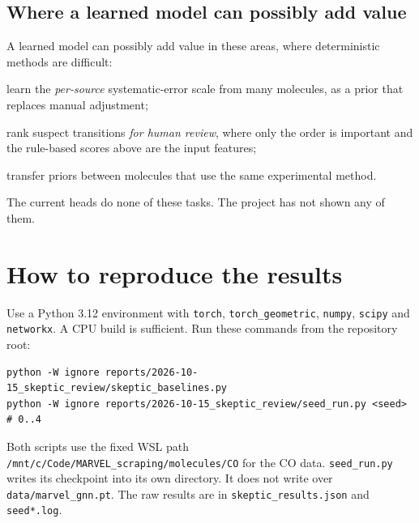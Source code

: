 \documentclass[11pt,a4paper]{article}
\newcommand{\code}[1]{\texttt{#1}}
\begin{document}
\subsection*{Where a learned model can possibly add value}
A learned model can possibly add value in these areas, where deterministic methods
are difficult:
\begin{enumerate*}[label=(\roman*)]
\item learn the \emph{per-source} systematic-error scale from many molecules, as a
  prior that replaces manual adjustment;
\item rank suspect transitions \emph{for human review}, where only the order is
  important and the rule-based scores above are the input features;
\item transfer priors between molecules that use the same experimental method.
\end{enumerate*}
The current heads do none of these tasks. The project has not shown any of them.

\appendix
\section{How to reproduce the results}
Use a Python 3.12 environment with \code{torch}, \code{torch\_geometric},
\code{numpy}, \code{scipy} and \code{networkx}. A CPU build is sufficient. Run these
commands from the repository root:
\begin{verbatim}
python -W ignore reports/2026-10-15_skeptic_review/skeptic_baselines.py
python -W ignore reports/2026-10-15_skeptic_review/seed_run.py <seed>   # 0..4
\end{verbatim}
Both scripts use the fixed WSL path \code{/mnt/c/Code/MARVEL\_scraping/molecules/CO}
for the CO data. \code{seed\_run.py} writes its checkpoint into its own directory. It
does not write over \code{data/marvel\_gnn.pt}. The raw results are in
\code{skeptic\_results.json} and \code{seed*.log}.
\end{document}
